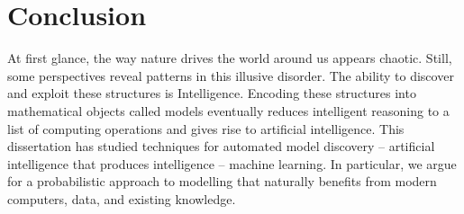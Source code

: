 \chapter{Conclusion}\label{ch:08}
At first glance, the way nature drives the world around us appears chaotic. Still, some perspectives reveal patterns in this illusive disorder. The ability to discover and exploit these structures is Intelligence. Encoding these structures into mathematical objects called models eventually reduces intelligent reasoning to a list of computing operations and gives rise to artificial intelligence. This dissertation has studied techniques for automated model discovery -- artificial intelligence that produces intelligence -- machine learning. In particular, we argue for a probabilistic approach to modelling that naturally benefits from modern computers, data, and existing knowledge.

%
%
%
%
%
%
%
%
%

